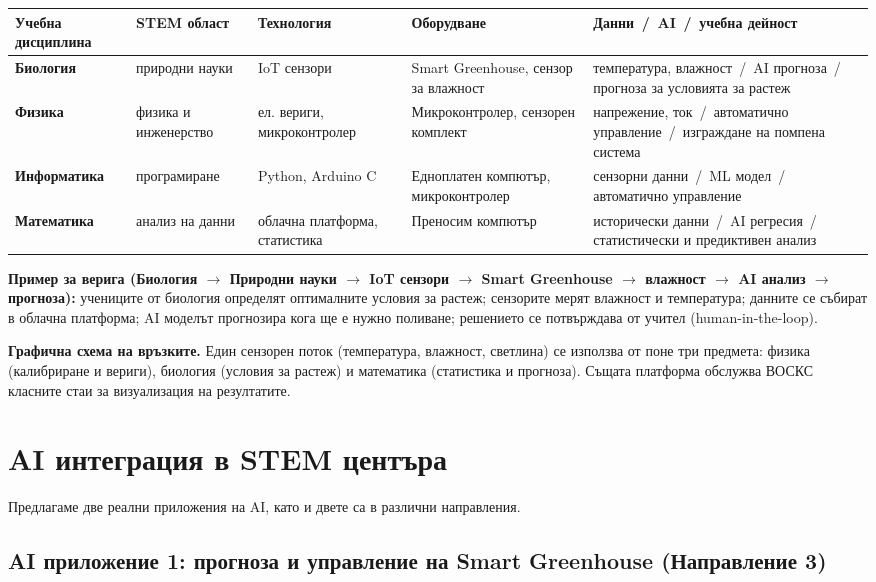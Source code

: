 \documentclass[11pt,a4paper]{article}
\begin{document}
\begin{table}[h]
\centering
\small
\begin{tabularx}{\textwidth}{@{}>{\bfseries}l X X X X@{}}
\toprule
Учебна дисциплина & STEM област & Технология & Оборудване & Данни \,/\, AI \,/\, учебна дейност \\
\midrule
Биология & природни науки & IoT сензори & Smart Greenhouse, сензор за влажност & температура, влажност \,/\, AI прогноза \,/\, прогноза за условията за растеж \\
Физика & физика и инженерство & ел. вериги, микроконтролер & Микроконтролер, сензорен комплект & напрежение, ток \,/\, автоматично управление \,/\, изграждане на помпена система \\
Информатика & програмиране & Python, Arduino C & Едноплатен компютър, микроконтролер & сензорни данни \,/\, ML модел \,/\, автоматично управление \\
Математика & анализ на данни & облачна платформа, статистика & Преносим компютър & исторически данни \,/\, AI регресия \,/\, статистически и предиктивен анализ \\
\bottomrule
\end{tabularx}
\end{table}

\textbf{Пример за верига (Биология $\rightarrow$ Природни науки $\rightarrow$ IoT сензори $\rightarrow$ Smart Greenhouse $\rightarrow$ влажност $\rightarrow$ AI анализ $\rightarrow$ прогноза):} учениците от биология определят оптималните условия за растеж; сензорите мерят влажност и температура; данните се събират в облачна платформа; AI моделът прогнозира кога ще е нужно поливане; решението се потвърждава от учител (human-in-the-loop).

\textbf{Графична схема на връзките.} Един сензорен поток (температура, влажност, светлина) се използва от поне три предмета: физика (калибриране и вериги), биология (условия за растеж) и математика (статистика и прогноза). Същата платформа обслужва ВОСКС класните стаи за визуализация на резултатите.

\section{AI интеграция в STEM центъра}

Предлагаме две реални приложения на AI, като и двете са в различни направления.

\subsection{AI приложение 1: прогноза и управление на Smart Greenhouse (Направление 3)}
\end{document}
